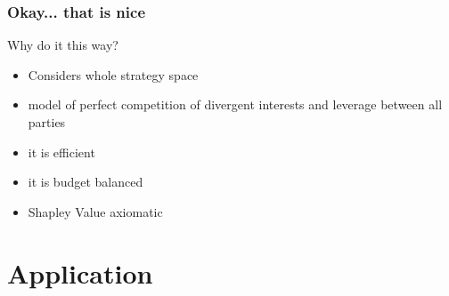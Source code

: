 \begin{frame}
\frametitle{Okay... that is nice}
Why do it this way?

\begin{itemize}
\item	Considers whole strategy space
\item	model of perfect competition of divergent interests and leverage between all parties
\item	it is efficient
\item	it is budget balanced
\item	Shapley Value axiomatic
\end{itemize}
\end{frame}


%
%



\section{Application}

